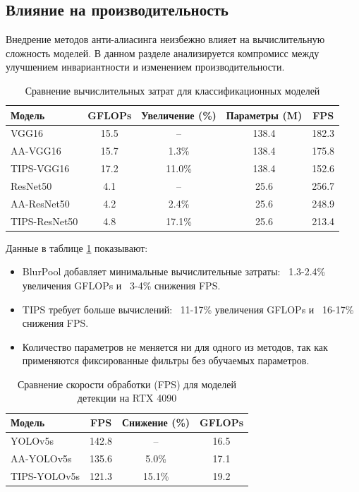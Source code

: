 \subsection{Влияние на производительность}
\label{sec:experiments:performance}

Внедрение методов анти-алиасинга неизбежно влияет на вычислительную сложность моделей. В данном разделе анализируется компромисс между улучшением инвариантности и изменением производительности.

\begin{table}[ht]
\centering
\caption{Сравнение вычислительных затрат для классификационных моделей}
\label{tab:computation_classification}
\begin{tabular}{|l|c|c|c|c|}
\hline
\textbf{Модель} & \textbf{GFLOPs} & \textbf{Увеличение (\%)} & \textbf{Параметры (M)} & \textbf{FPS} \\ \hline
VGG16 & 15.5 & -- & 138.4 & 182.3 \\ \hline
AA-VGG16 & 15.7 & 1.3\% & 138.4 & 175.8 \\ \hline
TIPS-VGG16 & 17.2 & 11.0\% & 138.4 & 152.6 \\ \hline
ResNet50 & 4.1 & -- & 25.6 & 256.7 \\ \hline
AA-ResNet50 & 4.2 & 2.4\% & 25.6 & 248.9 \\ \hline
TIPS-ResNet50 & 4.8 & 17.1\% & 25.6 & 213.4 \\ \hline
\end{tabular}
\end{table}

Данные в таблице \ref{tab:computation_classification} показывают:
\begin{itemize}
    \item BlurPool добавляет минимальные вычислительные затраты: ~1.3-2.4\% увеличения GFLOPs и ~3-4\% снижения FPS.
    \item TIPS требует больше вычислений: ~11-17\% увеличения GFLOPs и ~16-17\% снижения FPS.
    \item Количество параметров не меняется ни для одного из методов, так как применяются фиксированные фильтры без обучаемых параметров.
\end{itemize}

\begin{table}[ht]
\centering
\caption{Сравнение скорости обработки (FPS) для моделей детекции на RTX 4090}
\label{tab:fps_detection}
\begin{tabular}{|l|c|c|c|}
\hline
\textbf{Модель} & \textbf{FPS} & \textbf{Снижение (\%)} & \textbf{GFLOPs} \\ \hline
YOLOv5s & 142.8 & -- & 16.5 \\ \hline
AA-YOLOv5s & 135.6 & 5.0\% & 17.1 \\ \hline
TIPS-YOLOv5s & 121.3 & 15.1\% & 19.2 \\ \hline
\end{tabular}
\end{table}

